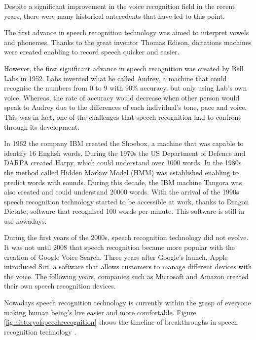 \documentclass{article}
\begin{document}
{\large
Despite a significant improvement in the voice recognition field in the recent years, there were many historical antecedents that have led to this point.\par
}

{\large
The first advance in speech recognition technology was aimed to interpret vowels and phonemes. Thanks to the great inventor Thomas Edison, dictations machines were created enabling to record speech quicker and easier.\par
}

\newpage
{\large
However, the first significant advance in speech recognition was created by Bell Labs in 1952. Labs invented what he called Audrey, a machine that could recognise the numbers from 0 to 9 with 90\% accuracy, but only using Lab's own voice. Whereas, the rate of accuracy would decrease when other person would speak to Audrey due to the differences of each individual’s tone, pace and voice. This was in fact, one of the challenges that speech recognition had to confront through its development.\par
}

{\large
In 1962 the company IBM created the Shoebox, a machine that was capable to identify 16 English words. During the 1970s the US Department of Defence and DARPA created Harpy, which could understand over 1000 words. In the 1980s the method called Hidden Markov Model (HMM) was established enabling to predict words with sounds. During this decade, the IBM machine Tangora was also created and could understand 20000 words. With the arrival of the 1990s speech recognition technology started to be accessible at work, thanks to Dragon Dictate, software that recognised 100 words per minute. This software is still in use nowadays.\par
}

{\large
During the first years of the 2000s, speech recognition technology did not evolve. It was not until 2008 that speech recognition became more popular with the creation of Google Voice Search. Three years after Google’s launch, Apple introduced Siri, a software that allows customers to manage different devices with the voice. The following years, companies such as Microsoft and Amazon created their own speech recognition devices.\par
}

{\large
Nowadays speech recognition technology is currently within the grasp of everyone making human being’s live easier and more comfortable. Figure \ref{fig:historyofspeechrecognition} shows the timeline of breakthroughs in speech recognition technology \parencite{historyofspeechrecognition}.\par
}
\end{document}
